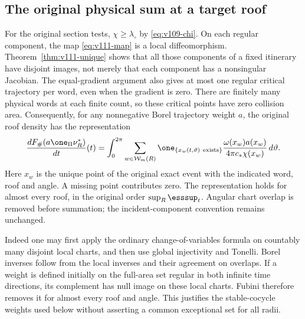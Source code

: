 \subsection{The original physical sum at a target roof}
For the original section tests, $\chi\ge\lambda_\circ$ by
\eqref{eq:v109-chi}. On each regular component, the map
\eqref{eq:v111-map} is a local diffeomorphism. Theorem~\ref{thm:v111-unique}
shows that all those components of a fixed itinerary have disjoint
images, not merely that each component has a nonsingular Jacobian.
The equal-gradient argument also gives at most one regular critical
trajectory per word, even when the gradient is zero. There are
finitely many physical words at each finite count, so these critical
points have zero collision area. Consequently, for any nonnegative
Borel trajectory weight $a$, the
original roof density has the representation
\begin{equation}\label{eq:v111-roof-sum}
 \frac{dF_\#(a\one_\Pi\nu_R^*)}{dt}(t)
  =\int_0^{2\pi}\sum_{w\in\mathcal W_m(R)}
       \one_{\{x_w(t,\vartheta)\ \mathrm{exists}\}}
       \frac{\omega(x_w)a(x_w)}{4\pi c_*\chi(x_w)}\,d\vartheta.
\end{equation}
Here $x_w$ is the unique point of the original exact event with the
indicated word, roof and angle. A missing point contributes zero.
The representation holds for almost every roof, in the original
order $\sup_R\esssup_t$. Angular chart overlap is removed before
summation; the incident-component convention remains unchanged.

Indeed one may first apply the ordinary change-of-variables formula
on countably many disjoint local charts, and then use global
injectivity and Tonelli. Borel inverses follow from the local inverses
and their agreement on overlaps. If a weight is defined initially on
the full-area set regular in both infinite time directions, its
complement has null image on these local charts. Fubini therefore
removes it for almost every roof and angle. This justifies the
stable-cocycle weights used below without asserting a common
exceptional set for all radii.
